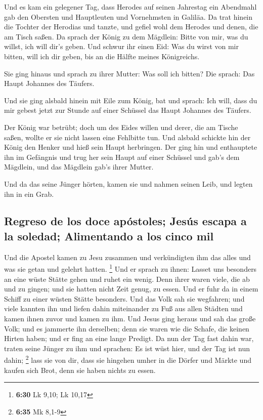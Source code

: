  Und es kam ein gelegener Tag, dass Herodes auf seinen
Jahrestag ein Abendmahl gab den Obersten und Hauptleuten und Vornehmsten
in Galiläa.  Da trat hinein die Tochter der Herodias und
tanzte, und gefiel wohl dem Herodes und denen, die am Tisch saßen. Da
sprach der König zu dem Mägdlein: Bitte von mir, was du willst, ich will
dir's geben.  Und schwur ihr einen Eid: Was du wirst von
mir bitten, will ich dir geben, bis an die Hälfte meines Königreichs.

 Sie ging hinaus und sprach zu ihrer Mutter: Was soll ich
bitten? Die sprach: Das Haupt Johannes des Täufers.

 Und sie ging alsbald hinein mit Eile zum König, bat und
sprach: Ich will, dass du mir gebest jetzt zur Stunde auf einer Schüssel
das Haupt Johannes des Täufers.

 Der König war betrübt; doch um des Eides willen und
derer, die am Tische saßen, wollte er sie nicht lassen eine Fehlbitte
tun.  Und alsbald schickte hin der König den Henker und
hieß sein Haupt herbringen. Der ging hin und enthauptete ihn im
Gefängnis  und trug her sein Haupt auf einer Schüssel und
gab's dem Mägdlein, und das Mägdlein gab's ihrer Mutter.

 Und da das seine Jünger hörten, kamen sie und nahmen
seinen Leib, und legten ihn in ein Grab.

\hypertarget{regreso-de-los-doce-apuxf3stoles-jesuxfas-escapa-a-la-soledad-alimentando-a-los-cinco-mil}{%
\subsection{Regreso de los doce apóstoles; Jesús escapa a la soledad;
Alimentando a los cinco
mil}\label{regreso-de-los-doce-apuxf3stoles-jesuxfas-escapa-a-la-soledad-alimentando-a-los-cinco-mil}}

 Und die Apostel kamen zu Jesu zusammen und verkündigten
ihm das alles und was sie getan und gelehrt hatten. \footnote{\textbf{6:30}
  Lk 9,10; Lk 10,17}  Und er sprach zu ihnen: Lasset uns
besonders an eine wüste Stätte gehen und ruhet ein wenig. Denn ihrer
waren viele, die ab und zu gingen; und sie hatten nicht Zeit genug, zu
essen.  Und er fuhr da in einem Schiff zu einer wüsten
Stätte besonders.  Und das Volk sah sie wegfahren; und
viele kannten ihn und liefen dahin miteinander zu Fuß aus allen Städten
und kamen ihnen zuvor und kamen zu ihm.  Und Jesus ging
heraus und sah das große Volk; und es jammerte ihn derselben; denn sie
waren wie die Schafe, die keinen Hirten haben; und er fing an eine lange
Predigt.  Da nun der Tag fast dahin war, traten seine
Jünger zu ihm und sprachen: Es ist wüst hier, und der Tag ist nun dahin;
\footnote{\textbf{6:35} Mk 8,1-9}  lass sie von dir, dass
sie hingehen umher in die Dörfer und Märkte und kaufen sich Brot, denn
sie haben nichts zu essen.

